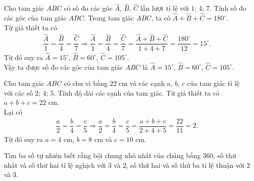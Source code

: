 \begin{vd}
 Cho tam giác $ABC$ có số đo các góc $\widehat{A}$, $\widehat{B}$, $\widehat{C}$ lần lượt tỉ lệ với $1$; $4$; $7$. Tính số đo các góc của tam giác $ABC$.
 \loigiai
  {
  Trong tam giác $ABC$, ta có $\widehat{A}+\widehat{B}+\widehat{C}=180^\circ$.\\
  Từ giả thiết ta có
  \begin{eqnarray*}
  	\dfrac{\widehat{A}}{1} = \dfrac{\widehat{B}}{4} = \dfrac{\widehat{C}}{7} \Rightarrow \dfrac{\widehat{A}}{1} = \dfrac{\widehat{B}}{4} = \dfrac{\widehat{C}}{7} = \dfrac{\widehat{A}+\widehat{B}+\widehat{C}}{1+4+7} = \dfrac{180^\circ}{12} = 15^\circ.
  \end{eqnarray*}
  Từ đó suy ra $\widehat{A}=15^\circ$, $\widehat{B}=60^\circ$, $\widehat{C}=105^\circ$.\\
  Vậy ta được số đo các góc của tam giác $ABC$ là $\widehat{A}=15^\circ$, $\widehat{B}=60^\circ$, $\widehat{C}=105^\circ$.
  }
\end{vd}

\begin{vd}
 Cho tam giác $ABC$ có chu vi bằng $22$ cm và các cạnh $a$, $b$, $c$ của tam giác tỉ lệ với các số $2$; $4$; $5$. Tính độ dài các cạnh của tam giác.
 \loigiai
  {
  Từ giả thiết ta có $a+b+c=22$ cm.\\
  Lại có
  \begin{eqnarray*}
  	\dfrac{a}{2} = \dfrac{b}{4} = \dfrac{c}{5} \Rightarrow \dfrac{a}{2}=\dfrac{b}{4} = \dfrac{c}{5}=\dfrac{a+b+c}{2+4+5}= \dfrac{22}{11} = 2.
  \end{eqnarray*}
  Từ đó suy ra $a=4$ cm, $b=8$ cm và $c=10$ cm.
  }
\end{vd}

\begin{vd}
Tìm ba số tự nhiên biết rằng bội chung nhỏ nhất của chúng bằng $360$, số thứ nhất và số thứ hai tỉ lệ nghịch với $3$ và $2$, số thứ hai và số thứ ba tỉ lệ thuận với $2$ và $3$.
\end{vd}

